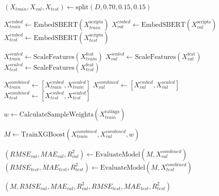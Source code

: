 \IncMargin{1em}

\begin{algorithm}[!b]

	
	
	\BlankLine
	
	$(X_{train}, X_{val}, X_{test}) \gets \text{split}(D, 0.70, 0.15, 0.15)$\; \label{split}
	
	$X_{train}^{embed} \gets \text{EmbedSBERT}(X_{train}^{\mathrm{scripts}})$\; \label{embed_train}
	$X_{val}^{embed} \gets \text{EmbedSBERT}(X_{val}^{\mathrm{scripts}})$\; \label{embed_val}
	$X_{test}^{embed} \gets \text{EmbedSBERT}(X_{test}^{\mathrm{scripts}})$\; \label{embed_test}
	
	$X_{train}^{scaled} \gets \text{ScaleFeatures}(X_{train}^{\mathrm{feat}})$\;
	$X_{val}^{scaled} \gets \text{ScaleFeatures}(X_{val}^{\mathrm{feat}})$\;
	$X_{test}^{scaled} \gets \text{ScaleFeatures}(X_{test}^{\mathrm{feat}})$\;
	
	$X_{train}^{combined} \gets [X_{train}^{embed}, X_{train}^{scaled}]$\; \label{combine_train}
	$X_{val}^{combined} \gets [X_{val}^{embed}, X_{val}^{scaled}]$\;
	$X_{test}^{combined} \gets [X_{test}^{embed}, X_{test}^{scaled}]$\; \label{combine_test}
	
	$w \gets \text{CalculateSampleWeights}(X_{train}^{\mathrm{ratings}})$\; 
	
	$M \gets \text{TrainXGBoost}(X_{train}^{combined}, X_{val}^{combined}, w)$\;
	
	$(RMSE_{val}, MAE_{val}, R^2_{val}) \gets \text{EvaluateModel}(M, X_{val}^{combined})$\;
	$(RMSE_{test}, MAE_{test}, R^2_{test}) \gets \text{EvaluateModel}(M, X_{test}^{combined})$\;
	
	\Return $(M, RMSE_{val}, MAE_{val}, R^2_{val}, RMSE_{test}, MAE_{test}, R^2_{test})$ \label{return_metrics}
	
	\caption{TrainXGBoostModel$(D)$}
	\label{alg:train_xgboost}
	
\end{algorithm}
\DecMargin{1em}
